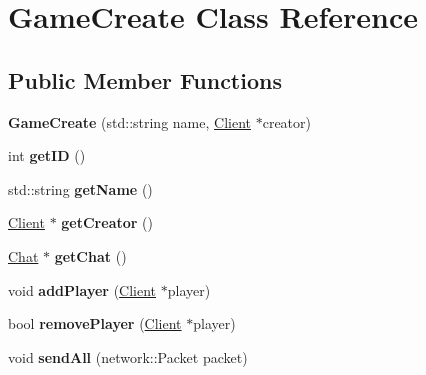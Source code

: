 \hypertarget{class_game_create}{\section{Game\-Create Class Reference}
\label{class_game_create}
}
\subsection*{Public Member Functions}
\begin{DoxyCompactItemize}
\item 
\hypertarget{class_game_create_acbcc08921bcf979183796ed4bb16bb9b}{{\bfseries Game\-Create} (std\-::string name, \hyperlink{class_client}{Client} $\ast$creator)}\label{class_game_create_acbcc08921bcf979183796ed4bb16bb9b}

\item 
\hypertarget{class_game_create_aee40816a64b4a9f078baef305fc30411}{int {\bfseries get\-I\-D} ()}\label{class_game_create_aee40816a64b4a9f078baef305fc30411}

\item 
\hypertarget{class_game_create_aafcb4e1f6058d897b6cf2ff48f9d1f10}{std\-::string {\bfseries get\-Name} ()}\label{class_game_create_aafcb4e1f6058d897b6cf2ff48f9d1f10}

\item 
\hypertarget{class_game_create_ac406855f93df117e3d4c2ad9a8d7f909}{\hyperlink{class_client}{Client} $\ast$ {\bfseries get\-Creator} ()}\label{class_game_create_ac406855f93df117e3d4c2ad9a8d7f909}

\item 
\hypertarget{class_game_create_a2bd9ddf2e20febf2fb316ca432488cac}{\hyperlink{class_chat}{Chat} $\ast$ {\bfseries get\-Chat} ()}\label{class_game_create_a2bd9ddf2e20febf2fb316ca432488cac}

\item 
\hypertarget{class_game_create_a6a2f12799d0f78433477eef7a2434f5f}{void {\bfseries add\-Player} (\hyperlink{class_client}{Client} $\ast$player)}\label{class_game_create_a6a2f12799d0f78433477eef7a2434f5f}

\item 
\hypertarget{class_game_create_aa6c7d2402c5b6b43886d09d61a57d369}{bool {\bfseries remove\-Player} (\hyperlink{class_client}{Client} $\ast$player)}\label{class_game_create_aa6c7d2402c5b6b43886d09d61a57d369}

\item 
\hypertarget{class_game_create_a8acc09e9ef018e306152384d948cbf98}{void {\bfseries send\-All} (network\-::\-Packet packet)}\label{class_game_create_a8acc09e9ef018e306152384d948cbf98}


\end{DoxyCompactItemize}
